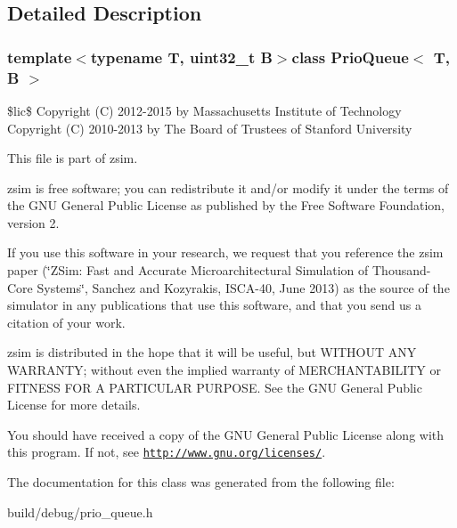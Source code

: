 \subsection{Detailed Description}
\subsubsection*{template$<$typename T, uint32\-\_\-t B$>$class Prio\-Queue$<$ T, B $>$}

\$lic\$ Copyright (C) 2012-\/2015 by Massachusetts Institute of Technology Copyright (C) 2010-\/2013 by The Board of Trustees of Stanford University

This file is part of zsim.

zsim is free software; you can redistribute it and/or modify it under the terms of the G\-N\-U General Public License as published by the Free Software Foundation, version 2.

If you use this software in your research, we request that you reference the zsim paper (\char`\"{}\-Z\-Sim\-: Fast and Accurate Microarchitectural Simulation of
\-Thousand-\/\-Core Systems\char`\"{}, Sanchez and Kozyrakis, I\-S\-C\-A-\/40, June 2013) as the source of the simulator in any publications that use this software, and that you send us a citation of your work.

zsim is distributed in the hope that it will be useful, but W\-I\-T\-H\-O\-U\-T A\-N\-Y W\-A\-R\-R\-A\-N\-T\-Y; without even the implied warranty of M\-E\-R\-C\-H\-A\-N\-T\-A\-B\-I\-L\-I\-T\-Y or F\-I\-T\-N\-E\-S\-S F\-O\-R A P\-A\-R\-T\-I\-C\-U\-L\-A\-R P\-U\-R\-P\-O\-S\-E. See the G\-N\-U General Public License for more details.

You should have received a copy of the G\-N\-U General Public License along with this program. If not, see \href{http://www.gnu.org/licenses/}{\tt http\-://www.\-gnu.\-org/licenses/}. 

The documentation for this class was generated from the following file\-:\begin{DoxyCompactItemize}
\item 
build/debug/prio\-\_\-queue.\-h\end{DoxyCompactItemize}
